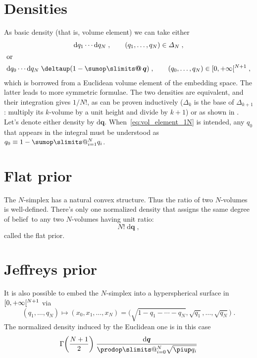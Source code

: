 \documentclass[\ifafour a4paper,12pt,\else a5paper,10pt,\fi%
onecolumn,oneside,article,%
british%
]{memoir}
\makeatletter
\theoremstyle{remark}
\theoremstyle{innote}
\def\sum{\DOTSI\sumop\slimits@}
\def\prod{\DOTSI\prodop\slimits@}
\newcommand*{\pu}{\piup}%
\newcommand*{\delt}{\deltaup}%
\newcommand*{\di}{\mathrm{d}}%
\DeclarePairedDelimiter\clop{[}{[}
\renewcommand*{\|}[1][]{\nonscript\,#1\vert\nonscript\;\mathopen{}}
\newcommand*{\sect}{\S}%
\newcommand*{\tsum}{\mathop{\textstyle\sum}\nolimits}
\newcommand*{\dob}{degree of belief}
\newcommand*{\yq}{\bm{q}}
\newcommand*{\ysim}{\varDelta}
\newcommand*{\ysum}{\bm{\tsum}}
\makeatother
\begin{document}
\section{Densities}
\label{sec:densities}

As basic
density (that is, volume element) we can take either
\begin{gather}
  \label{eq:vol_element_1N}
  \di q_1 \dotsm \di q_N\;,
  \qquad (q_1,\dotsc,q_N) \in \ysim_N\;,
\\\shortintertext{or}
  \label{eq:vol_element_0N}
  \di q_0 \dotsm \di q_N\;\delt(1-\ysum\yq)\;,
  \qquad (q_0,\dotsc,q_N) \in \clop{0,+\infty}^{N+1}\;,
\end{gather}
which is borrowed from a Euclidean volume element of the embedding space.
The latter leads to more symmetric formulae. The two densities are
equivalent, and their integration gives $1/N!$, as can be proven
inductively ($\ysim_k$ is the base of $\ysim_{k+1}$: multiply its
$k$-volume by a unit height and divide by $k+1$) or as shown in
\textcite[\sect~18.10]{jaynes1994_r2003}. Let's denote either density by
$\di\yq$. When~\eqref{eq:vol_element_1N} is intended, any $q_0$ that
appears in the integral must be understood as $q_0 \equiv 1-\sum_{i=1}^N q_i$.

\section{Flat prior}
\label{sec:flat}


The $N$-simplex has a natural convex structure. Thus the ratio of two
$N$-volumes is well-defined. There's only one normalized density that assigns
the same \dob\ to any two $N$-volumes having unit ratio:
\begin{equation}
  \label{eq:canonical_unif_density}
  N! \;\di\yq\;,
\end{equation}
called the flat prior.

\section{Jeffreys prior}
\label{sec:jeffreys}

It is also possible to embed the $N$-simplex into a hyperspherical surface
in $\clop{0,+\infty}^{N+1}$ via
\begin{equation}
  \label{eq:sphere_embedding}
  (q_1, \dotsc, q_N) \mapsto (x_0, x_1,\dotsc, x_N) =
  \bigl( \sqrt{1-q_1 -\dotsb -q_N}, \sqrt{q_1}, \dotsc, \sqrt{q_N} \bigr)\;.
\end{equation}
The normalized density induced by the Euclidean one is in this case
\begin{equation}
  \label{eq:jeffreys_prior}
  \Gamma\biggl( \frac{N+1}{2} \biggr)\;
  \frac{\di\yq}{\prod_{i=0}^{N}\sqrt{\pu q_i}}
\end{equation}
\end{document}
